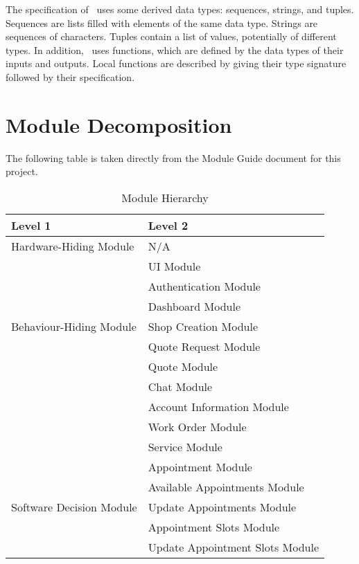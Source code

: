 \documentclass[12pt, titlepage]{article}
\begin{document}
\noindent
The specification of \progname \ uses some derived data types: sequences, strings, and
tuples. Sequences are lists filled with elements of the same data type. Strings
are sequences of characters. Tuples contain a list of values, potentially of
different types. In addition, \progname \ uses functions, which
are defined by the data types of their inputs and outputs. Local functions are
described by giving their type signature followed by their specification.

\section{Module Decomposition}

The following table is taken directly from the Module Guide document for this project.

\begin{table}[h!]
\centering
\begin{tabular}{p{} p{}}
\toprule
\textbf{Level 1} & \textbf{Level 2}\\
\midrule

{Hardware-Hiding Module} & N/A \\
\midrule

\multirow{7}{0.3\textwidth}{Behaviour-Hiding Module}
& UI Module\\
& Authentication Module\\ 
& Dashboard Module\\
& Shop Creation Module\\ 
& Quote Request Module\\ 
& Quote Module\\
& Chat Module\\ 
& Account Information Module\\
& Work Order Module\\
& Service Module\\
& Appointment Module\\ 
\midrule

\multirow{3}{0.3\textwidth}{Software Decision Module}
& Available Appointments Module\\
& Update Appointments Module\\
& Appointment Slots Module\\
& Update Appointment Slots Module\\
\bottomrule

\end{tabular}
\caption{Module Hierarchy}
\label{TblMH}
\end{table}
\end{document}
